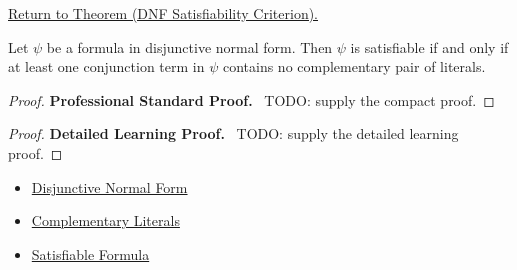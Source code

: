 \newpage
{}
\label{prf:dnf-satisfiability-criterion-propositional-logic}

\begin{remark*}[Return]
\hyperref[thm:dnf-satisfiability-criterion-propositional-logic]{Return to Theorem (DNF Satisfiability Criterion).}
\end{remark*}

\begin{theorem*}
Let \(\psi\) be a formula in disjunctive normal form. Then \(\psi\) is
satisfiable if and only if at least one conjunction term in \(\psi\) contains
no complementary pair of literals.
\end{theorem*}

\begin{proof}
\textbf{Professional Standard Proof.}~
TODO: supply the compact proof.
\end{proof}

\begin{proof}
\textbf{Detailed Learning Proof.}~
TODO: supply the detailed learning proof.
\end{proof}

\begin{remark*}
\end{remark*}

\begin{dependencies}
\begin{itemize}
  \item \hyperref[def:disjunctive-normal-form-propositional-logic]{Disjunctive Normal Form}
  \item \hyperref[def:complementary-literals-propositional-logic]{Complementary Literals}
  \item \hyperref[def:satisfiable-formula-propositional-logic]{Satisfiable Formula}
\end{itemize}
\end{dependencies}

\clearpage
